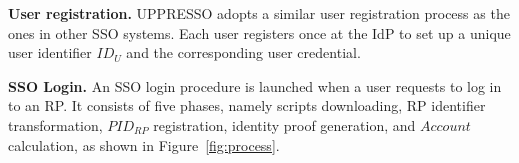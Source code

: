 \noindent\textbf{User registration.} UPPRESSO adopts a similar user registration process as the ones in other SSO systems. Each user registers once at the IdP to set up a unique user identifier $ID_U$ and the corresponding user credential. 

\noindent\textbf{SSO Login.} An SSO login procedure is launched when a user requests to log in to an RP.
It consists of five phases, namely scripts downloading, RP identifier transformation, $PID_{RP}$ registration, identity proof generation, and $Account$ calculation, as shown in Figure~\ref{fig:process}.

